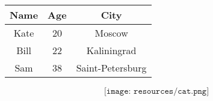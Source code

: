 \documentclass{article}
\begin{document}
\begin{center}
\begin{tabular}{|c|c|c|}
\hline
Name & Age & City \\
\hline
Kate & 20 & Moscow \\
\hline
Bill & 22 & Kaliningrad \\
\hline
Sam & 38 & Saint-Petersburg \\
\hline
\end{tabular}
\end{center}
$$\texttt{[image: resources/cat.png]}$$
\end{document}
